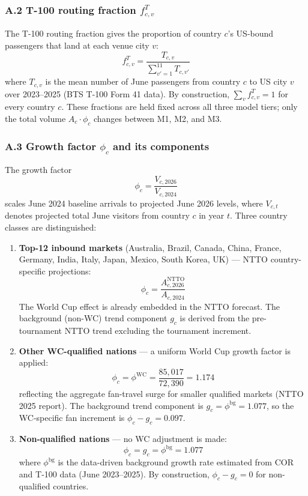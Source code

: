 \documentclass[12pt, a4paper]{article}
\begin{document}
\subsubsection*{A.2 T-100 routing fraction $f_{c,v}^{T}$}

The T-100 routing fraction gives the proportion of country $c$'s
US-bound passengers that land at each venue city $v$:
\[
  f_{c,v}^{T} = \frac{T_{c,v}}{\displaystyle\sum_{v'=1}^{11} T_{c,v'}}
\]
where $T_{c,v}$ is the mean number of June passengers from country
$c$ to US city $v$ over 2023--2025 (BTS T-100 Form 41 data). By
construction, $\sum_{v} f_{c,v}^{T} = 1$ for every country $c$.
These fractions are held fixed across all three model tiers; only
the total volume $A_c \cdot \phi_c$ changes between M1, M2, and M3.

\subsubsection*{A.3 Growth factor $\phi_c$ and its components}

The growth factor
\[
  \phi_c = \frac{V_{c,2026}}{V_{c,2024}}
\]
scales June 2024 baseline arrivals to projected June 2026 levels,
where $V_{c,t}$ denotes projected total June visitors from country
$c$ in year $t$. Three country classes are distinguished:

\begin{enumerate}
  \item \textbf{Top-12 inbound markets} (Australia, Brazil, Canada,
    China, France, Germany, India, Italy, Japan, Mexico, South Korea,
    UK) --- NTTO country-specific projections:
    \[
      \phi_c = \frac{A_{c,2026}^{\text{NTTO}}}{A_{c,2024}}
    \]
    The World Cup effect is already embedded in the NTTO forecast.
    The background (non-WC) trend component $g_c$ is derived from
    the pre-tournament NTTO trend excluding the tournament increment.

  \item \textbf{Other WC-qualified nations} --- a uniform World Cup
    growth factor is applied:
    \[
      \phi_c = \phi^{\text{WC}} = \frac{85{,}017}{72{,}390} = 1.174
    \]
    reflecting the aggregate fan-travel surge for smaller qualified
    markets (NTTO 2025 report). The background trend component is
    $g_c = \phi^{\text{bg}} = 1.077$, so the WC-specific fan
    increment is $\phi_c - g_c = 0.097$.

  \item \textbf{Non-qualified nations} --- no WC adjustment is made:
    \[
      \phi_c = g_c = \phi^{\text{bg}} = 1.077
    \]
    where $\phi^{\text{bg}}$ is the data-driven background growth
    rate estimated from COR and T-100 data (June 2023--2025).
    By construction, $\phi_c - g_c = 0$ for non-qualified countries.
\end{enumerate}
\end{document}
